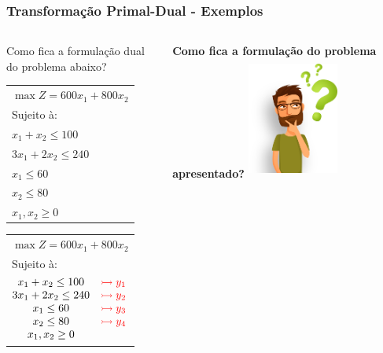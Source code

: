 \documentclass{beamer}
\begin{document}
\begin{frame}
	\frametitle{Transformação Primal-Dual - Exemplos}
	\begin{columns}
		\begin{column}{5cm}
			\centering
			\begin{block}{Como fica a formulação dual do problema abaixo?}
				\begin{table}
					{
						\begin{tabular}{l}
							$\max Z = 600x_1 + 800x_2$ \\
							Sujeito à: \\
							$x_1 + x_2 \le 100$ \\
							$3x_1 + 2x_2 \le 240$ \\
							$x_1 \le 60$ \\
							$x_2 \le 80$ \\
							$x_1, x_2 \ge 0$ \\
						\end{tabular}
					}
					{
						\begin{tabular}{l}
							$\max Z = 600x_1 + 800x_2$ \\
							Sujeito à: \\
							$
							\begin{matrix}
								x_1 + x_2 \le 100    	& \color{red} \rightarrowtail y_1\\
								3x_1 + 2x_2 \le 240 	& \color{red} \rightarrowtail y_2\\
								x_1 \le 60 		  	 	& \color{red} \rightarrowtail y_3\\
								x_2 \le 80 		   		& \color{red} \rightarrowtail y_4\\
								x_1, x_2 \ge 0 	   		& \\
							\end{matrix}
							$
						\end{tabular}
					}					
				\end{table}
			\end{block}
		\end{column}
		\begin{column}{6cm}
			\only<1>
			{
				\centering
				\Large \textbf{\color{orange} Como fica a formulação do problema apresentado?}
				\includegraphics[width=3cm,height=4cm]{Duvida.png}
}
\end{column}
\end{columns}
\end{frame}
\end{document}
